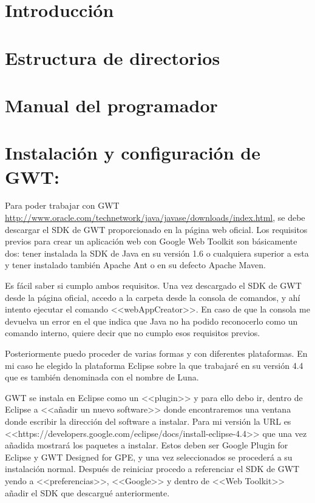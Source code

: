 
\section{Introducción}


\section{Estructura de directorios}

\section{Manual del programador}


\section{Instalación y configuración de GWT:}


Para poder trabajar con GWT \url{http://www.oracle.com/technetwork/java/javase/downloads/index.html}, se debe descargar el SDK de GWT proporcionado en la página web oficial. Los requisitos previos para crear un aplicación web con Google Web Toolkit son básicamente dos: tener instalada la SDK de Java en su versión 1.6 o cualquiera superior a esta y tener instalado también Apache Ant o en su defecto Apache Maven.

Es fácil saber si cumplo ambos requisitos. Una vez descargado el SDK de GWT desde la página oficial, accedo a la carpeta desde la consola de comandos, y ahí intento ejecutar el comando <<webAppCreator>>. En caso de que la consola me devuelva un error en el que indica que Java no ha podido reconocerlo como un comando interno, quiere decir que no cumplo esos requisitos previos.

Posteriormente puedo proceder de varias formas y con diferentes plataformas.
En mi caso he elegido la plataforma Eclipse sobre la que trabajaré en su
versión 4.4 que es también denominada  con el nombre de Luna.

GWT se instala en Eclipse como un <<plugin>> y para ello debo ir, dentro de Eclipse a <<añadir un nuevo software>> donde encontraremos una ventana donde escribir la dirección del software a instalar. Para mi versión la URL es <<https://developers.google.com/eclipse/docs/install-eclipse-4.4>> que una vez añadida mostrará los paquetes a instalar. Estos deben ser Google Plugin for Eclipse y GWT Designed for GPE, y una vez seleccionados se procederá a su instalación normal. Después de reiniciar procedo a referenciar el SDK de GWT yendo a <<preferencias>>, <<Google>> y dentro de <<Web Toolkit>> añadir el SDK que descargué anteriormente. 

